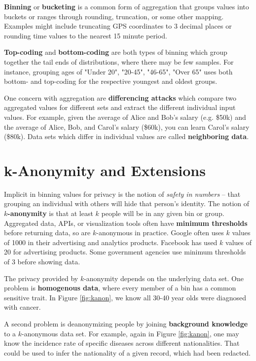 \documentclass[nobib]{tufte-handout}
\begin{document}
\textbf{Binning} or \textbf{bucketing} is a common form of aggregation that
groups values into buckets or ranges through rounding, truncation, or some
other mapping. Examples might include truncating GPS coordinates to 3 decimal
places or rounding time values to the nearest 15 minute period.

\textbf{Top-coding} and \textbf{bottom-coding} are both types of binning which
group together the tail ends of distributions, where there may be few samples.
For instance, grouping ages of "Under 20", "20-45", "46-65", "Over 65" uses both
bottom- and top-coding for the respective youngest and oldest groups.

One concern with aggregation are \textbf{differencing attacks} which compare two
aggregated values for different sets and extract the different individual input
values. For example, given the average of Alice and Bob’s salary (e.g. \$50k)
and the average of Alice, Bob, and Carol’s salary (\$60k), you can learn
Carol’s salary (\$80k). Data sets which differ in individual values are
called \textbf{neighboring data}.

\section{k-Anonymity and Extensions}

Implicit in binning values for privacy is the notion of
\textit{safety in numbers} -- that grouping an individual with others will hide
that person's identity. The notion of \textbf{$k$-anonymity}
\cite{DBLP:journals/ijufks/Sweene02} is that at least $k$ people will be in any
given bin or group. Aggregated data, APIs, or visualization tools often have
\textbf{minimum thresholds} before returning data, so are $k$-anonymous in
practice. Google often uses $k$ values of 1000 in their advertising and
analytics products. Facebook has used $k$ values of 20 for advertising products.
Some government agencies use minimum thresholds of 3 before showing data.

The privacy provided by $k$-anonymity depends on the underlying data set. One
problem is \textbf{homogenous data}, where every member of a bin has a common
sensitive trait. In Figure \ref{fig:kanon}, we know all 30-40 year olds were
diagnosed with cancer.

A second problem is deanonymizing people by joining \textbf{background
knowledge} to a $k$-anonymous data set. For example, again in Figure
\ref{fig:kanon}, one may know the incidence rate of specific diseases across
different nationalities. That could be used to infer the nationality of a given
record, which had been redacted.
\end{document}
